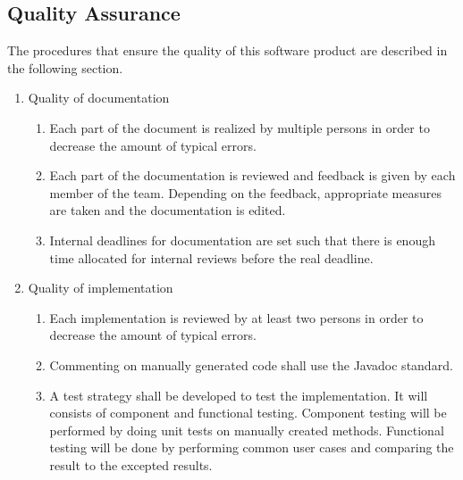 \subsection{Quality Assurance}
The procedures that ensure the quality of this software product are described in the following section.
\begin{enumerate}
	\item Quality of documentation
	\begin{enumerate}
		\item Each part of the document is realized by multiple persons in order to decrease the amount of typical errors.
		\item Each part of the documentation is reviewed and feedback is given by each member of the team. Depending on the feedback, appropriate measures are taken and the documentation is edited.
		\item Internal deadlines for documentation are set such that there is enough time allocated for internal reviews before the real deadline.
	\end{enumerate}
	\item Quality of implementation
	\begin{enumerate}
		\item Each implementation is reviewed by at least two persons in order to decrease the amount of typical errors.
		\item Commenting on manually generated code shall use the Javadoc standard.
		\item A test strategy shall be developed to test the implementation. It will consists of component and functional testing. Component testing will be performed by doing unit tests on manually created methods. Functional testing will be done by performing common user cases and comparing the result to the excepted results.
	\end{enumerate}
\end{enumerate}

